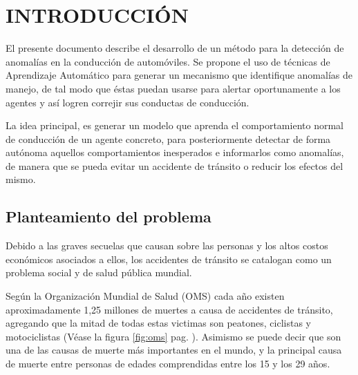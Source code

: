 
\chapter{\uppercase{Introducción}}
\label{Capitulo 1}


El presente documento describe el desarrollo de un m\'{e}todo para la detecci\'{o}n de anomal\'{i}as en la conducci\'{o}n de autom\'{o}viles. Se propone el uso de t\'{e}cnicas de Aprendizaje Autom\'{a}tico para generar un mecanismo que identifique anomal\'{i}as de manejo, de tal modo que \'{e}stas puedan usarse para alertar oportunamente a los agentes y as\'{i} logren correjir sus conductas de conducci\'{o}n.

\vspace{5mm} %

La idea principal, es generar un modelo que aprenda el comportamiento normal de conducci\'{o}n de un agente concreto, para posteriormente detectar de forma aut\'{o}noma aquellos comportamientos inesperados e informarlos como anomal\'{i}as, de manera que se pueda evitar  un accidente de tr\'{a}nsito o reducir los efectos del mismo.

\section{Planteamiento del problema}

Debido a las graves secuelas que causan sobre las personas y los altos costos econ\'{o}micos asociados a ellos, los accidentes de tr\'{a}nsito se catalogan como un problema social y de salud p\'{u}blica mundial.

\vspace{5mm} %

Seg\'{u}n la Organizaci\'{o}n Mundial de Salud (OMS) cada a\~{n}o existen aproximadamente 1,25 millones de muertes a causa de accidentes de tr\'{a}nsito, agregando que la mitad de todas estas victimas son peatones, ciclistas y motociclistas (V\'{e}ase la figura \ref{fig:oms} pag. \pageref{fig:oms}). Asimismo se puede decir que son una de las causas de muerte más importantes en el mundo, y la principal causa de muerte entre personas de edades comprendidas entre los 15 y los 29 años. 

